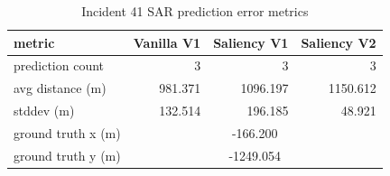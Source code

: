 \begin{table}[ht]
\centering
\caption{Incident 41 SAR prediction error metrics}
\label{tab:sar-incident-41}
\begin{tabular}{lrrr}
\hline
metric & Vanilla V1 & Saliency V1 & Saliency V2 \\
\hline
prediction count & 3 & 3 & 3 \\
avg distance (m) & 981.371 & 1096.197 & 1150.612 \\
stddev (m) & 132.514 & 196.185 & 48.921 \\
ground truth x (m) & \multicolumn{3}{c}{-166.200} \\
ground truth y (m) & \multicolumn{3}{c}{-1249.054} \\
\hline
\end{tabular}
\end{table}
